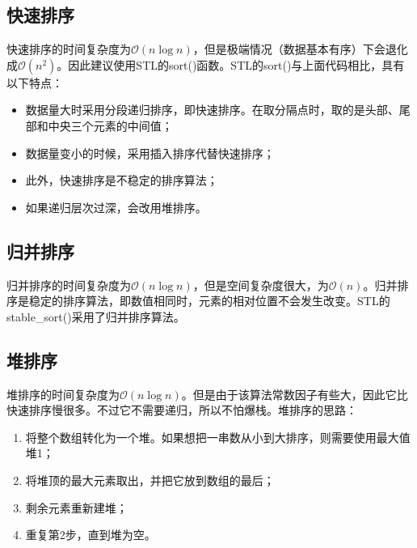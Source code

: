 \subsection{快速排序}

快速排序的时间复杂度为$\mathcal{O}(n\log n)$，但是极端情况（数据基本有序）下会退化成$\mathcal{O}(n^2)$。因此建议使用STL的sort()函数。STL的sort()与上面代码相比，具有以下特点：

\begin{itemize}
  \item 数据量大时采用分段递归排序，即快速排序。在取分隔点时，取的是头部、尾部和中央三个元素的中间值；
  \item 数据量变小的时候，采用插入排序代替快速排序；
  \item 此外，快速排序是不稳定的排序算法；
  \item 如果递归层次过深，会改用堆排序。
\end{itemize}



\subsection{归并排序}

归并排序的时间复杂度为$\mathcal{O}(n\log n)$，但是空间复杂度很大，为$\mathcal{O}(n)$。归并排序是稳定的排序算法，即数值相同时，元素的相对位置不会发生改变。STL的stable\_sort()采用了归并排序算法。



\subsection{堆排序}

堆排序的时间复杂度为$\mathcal{O}(n\log n)$。但是由于该算法常数因子有些大，因此它比快速排序慢很多。不过它不需要递归，所以不怕爆栈。堆排序的思路：

\begin{enumerate}
  \item 将整个数组转化为一个堆。如果想把一串数从小到大排序，则需要使用最大值堆1；
  \item 将堆顶的最大元素取出，并把它放到数组的最后；
  \item 剩余元素重新建堆；
  \item 重复第2步，直到堆为空。
\end{enumerate}


